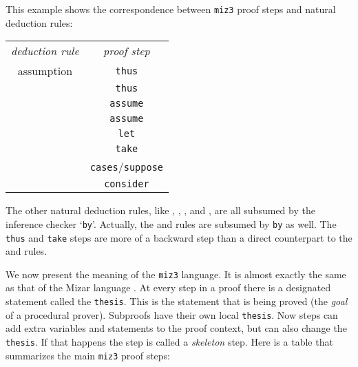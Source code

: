 \documentclass{LMCS}
\let\xmedskip=\medskip
\begin{document}
This example shows the correspondence between \texttt{miz3} proof steps
and natural deduction rules:

\xmedskip
\begin{center}
\begin{tabular}{cc}
\emph{deduction rule} & \emph{proof step} \\
\noalign{\smallskip}
\hline
\noalign{\smallskip}
assumption & \texttt{thus} \\
\noalign{\medskip}
 & \texttt{thus} \\
 & \texttt{assume} \\
 & \texttt{assume} \\
 & \texttt{let} \\
 & \texttt{take} \\
\noalign{\medskip}
 & \texttt{cases}/\texttt{suppose} \\
 & \texttt{consider}
\end{tabular}
\end{center}
\xmedskip
\xmedskip
\xmedskip

\noindent
The other natural deduction rules, like , , ,  and , are all subsumed by the
inference checker `\texttt{by}'.
Actually, the  and  rules are subsumed by \texttt{by} as well.
The \texttt{thus} and \texttt{take} steps are more of a backward step than a direct
counterpart to the
 and  rules.

We now present the meaning of the \texttt{miz3} language.
It is almost exactly the same as that
of the Mizar language \cite{gra:kor:nau:10}.
At every step in a proof there is a designated statement called the \texttt{thesis}.
This is the statement that is being proved (the \emph{goal} of a procedural prover).
Subproofs have their own local \texttt{thesis}.
Now steps can add extra variables and statements to the proof context,
but can also change the \texttt{thesis}.
If that happens the step is called
a \emph{skeleton} step.
Here is a table that summarizes the main \texttt{miz3} proof steps:
\end{document}
